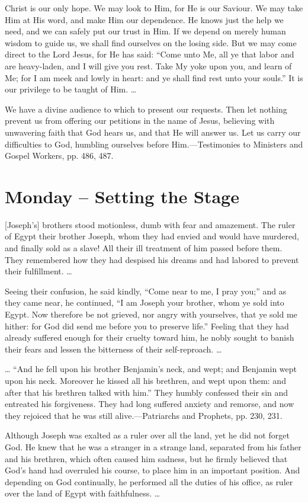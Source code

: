 \documentclass[a4paper, 10pt, twoside, headings=small]{scrartcl}
\begin{document}
\begin{multicols}{2}
Christ is our only hope. We may look to Him, for He is our Saviour. We may take Him at His word, and make Him our dependence. He knows just the help we need, and we can safely put our trust in Him. If we depend on merely human wisdom to guide us, we shall find ourselves on the losing side. But we may come direct to the Lord Jesus, for He has said: “Come unto Me, all ye that labor and are heavy-laden, and I will give you rest. Take My yoke upon you, and learn of Me; for I am meek and lowly in heart: and ye shall find rest unto your souls.” It is our privilege to be taught of Him. …

We have a divine audience to which to present our requests. Then let nothing prevent us from offering our petitions in the name of Jesus, believing with unwavering faith that God hears us, and that He will answer us. Let us carry our difficulties to God, humbling ourselves before Him.—Testimonies to Ministers and Gospel Workers, pp. 486, 487.

\section*{Monday – Setting the Stage}

[Joseph’s] brothers stood motionless, dumb with fear and amazement. The ruler of Egypt their brother Joseph, whom they had envied and would have murdered, and finally sold as a slave! All their ill treatment of him passed before them. They remembered how they had despised his dreams and had labored to prevent their fulfillment. …

Seeing their confusion, he said kindly, “Come near to me, I pray you;” and as they came near, he continued, “I am Joseph your brother, whom ye sold into Egypt. Now therefore be not grieved, nor angry with yourselves, that ye sold me hither: for God did send me before you to preserve life.” Feeling that they had already suffered enough for their cruelty toward him, he nobly sought to banish their fears and lessen the bitterness of their self-reproach. …

… “And he fell upon his brother Benjamin’s neck, and wept; and Benjamin wept upon his neck. Moreover he kissed all his brethren, and wept upon them: and after that his brethren talked with him.” They humbly confessed their sin and entreated his forgiveness. They had long suffered anxiety and remorse, and now they rejoiced that he was still alive.—Patriarchs and Prophets, pp. 230, 231.

Although Joseph was exalted as a ruler over all the land, yet he did not forget God. He knew that he was a stranger in a strange land, separated from his father and his brethren, which often caused him sadness, but he firmly believed that God’s hand had overruled his course, to place him in an important position. And depending on God continually, he performed all the duties of his office, as ruler over the land of Egypt with faithfulness. …


\end{multicols}
\end{document}

